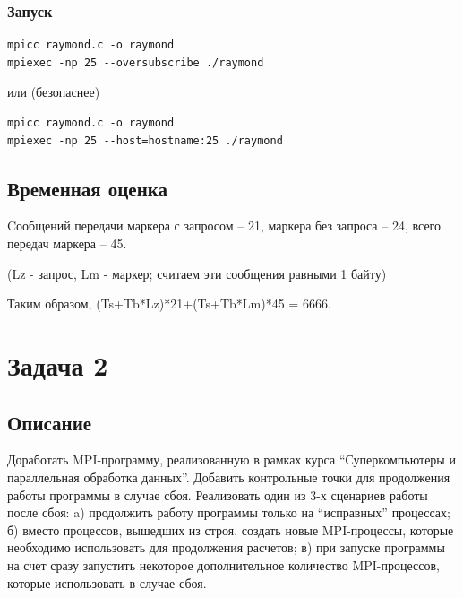 \documentclass[a4paper,12pt,titlepage,final]{article}
\begin{document}
\subsubsection{Запуск}
\begin{verbatim}
mpicc raymond.c -o raymond
mpiexec -np 25 --oversubscribe ./raymond
\end{verbatim}
или (безопаснее)
\begin{verbatim}
mpicc raymond.c -o raymond
mpiexec -np 25 --host=hostname:25 ./raymond
\end{verbatim}
\subsection{Временная оценка}
Cообщений передачи маркера с запросом – 21, маркера без запроса – 24, всего передач маркера – 45.\par
(Lz - запрос, Lm - маркер; считаем эти сообщения равными 1 байту)\par
Таким образом, (Ts+Tb*Lz)*21+(Ts+Tb*Lm)*45 = 6666.
\newpage
\section{Задача 2}
\subsection{Описание}
Доработать MPI-программу, реализованную в рамках курса “Суперкомпьютеры и параллельная обработка данных”. Добавить контрольные точки для продолжения работы программы в случае сбоя. Реализовать один из 3-х сценариев работы после сбоя: a) продолжить работу программы только на “исправных” процессах; б) вместо процессов, вышедших из строя, создать новые MPI-процессы, которые необходимо использовать для продолжения расчетов; в) при запуске программы на счет сразу запустить некоторое дополнительное количество MPI-процессов, которые использовать в случае сбоя.
\end{document}
